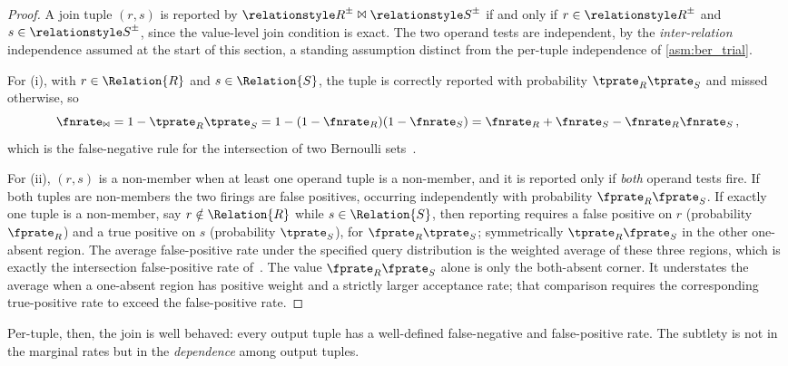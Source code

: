 \documentclass[ ../main.tex]{subfiles}
\begin{document}
\begin{proof}
A join tuple $(r,s)$ is reported by $\ARelation{R} \Join \ARelation{S}$ if and
only if $r \in \ARelation{R}$ and $s \in \ARelation{S}$, since the value-level
join condition is exact. The two operand tests are independent, by the
\emph{inter-relation} independence assumed at the start of this section, a
standing assumption distinct from the per-tuple independence of
\cref{asm:ber_trial}.

For (i), with $r \in \Relation{R}$ and $s \in \Relation{S}$, the tuple is correctly
reported with probability $\tprate_R \tprate_S$ and missed otherwise, so
\begin{equation}
    \fnrate_\Join = 1 - \tprate_R \tprate_S
                  = 1 - (1-\fnrate_R)(1-\fnrate_S)
                  = \fnrate_R + \fnrate_S - \fnrate_R \fnrate_S\,,
\end{equation}
which is the false-negative rule for the intersection of two Bernoulli
sets~\cite{bernoulliComposition}.

For (ii), $(r,s)$ is a non-member when at least one operand tuple is a non-member,
and it is reported only if \emph{both} operand tests fire. If both tuples are
non-members the two firings are false positives, occurring independently with
probability $\fprate_R \fprate_S$. If exactly one tuple is a non-member, say
$r \notin \Relation{R}$ while $s \in \Relation{S}$, then reporting requires a
false positive on $r$ (probability $\fprate_R$) and a true positive on $s$
(probability $\tprate_S$), for $\fprate_R \tprate_S$; symmetrically
$\tprate_R \fprate_S$ in the other one-absent region. The average
false-positive rate under the specified query distribution is the weighted average of these three regions,
which is exactly the intersection false-positive rate
of~\cite{bernoulliComposition}. The value $\fprate_R\fprate_S$ alone is only
the both-absent corner. It understates the average when a one-absent region
has positive weight and a strictly larger acceptance rate; that comparison
requires the corresponding true-positive rate to exceed the false-positive
rate.
\end{proof}

Per-tuple, then, the join is well behaved: every output tuple has a well-defined
false-negative and false-positive rate. The subtlety is not in the marginal rates
but in the \emph{dependence} among output tuples.
\end{document}
